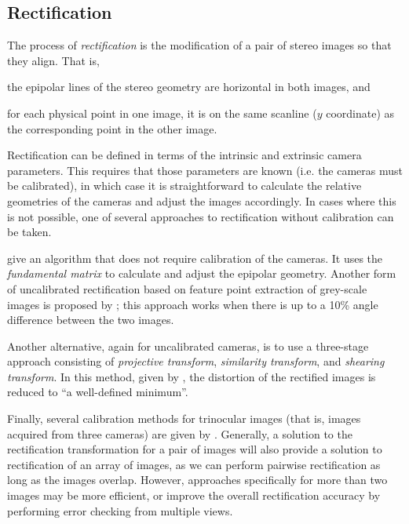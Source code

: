 \subsection{Rectification}
\label{sec:rectification-prior}

The process of \emph{rectification} is the modification of a pair of stereo images so that they align. That is, \begin{inparaenum}[(a)] \item the epipolar lines of the stereo geometry are horizontal in both images, and
\item for each physical point in one image, it is on the same scanline ($y$ coordinate) as the corresponding point in the other image. \end{inparaenum}

Rectification can be defined in terms of the intrinsic and extrinsic camera parameters. This requires that those parameters are known (i.e. the cameras must be calibrated), in which case it is straightforward to calculate the relative geometries of the cameras and adjust the images accordingly. In cases where this is not
possible, one of several approaches to rectification without calibration can be taken.

\citet{chen03} give an algorithm that does not require calibration of the cameras. It uses the \emph{fundamental matrix} to calculate and adjust the epipolar geometry. Another form of uncalibrated rectification based on feature point extraction of grey-scale images is proposed by
\citet{papadimitriou96:_epipol}; this approach works when there is up to a 10\% angle
difference between the two images.

Another alternative, again for uncalibrated cameras, is to use a three-stage approach consisting of \emph{projective transform}, \emph{similarity transform}, and \emph{shearing transform}. In this method, given by \citet{loop99:_comput}, the distortion of the rectified images is reduced to ``a well-defined minimum''.

Finally, several calibration methods for trinocular images (that is, images acquired from three cameras) are given by \citet{sun03:_uncal}. Generally, a solution to the rectification transformation for a pair of images will also provide a solution to rectification of an array of images, as we can perform pairwise rectification as long as the images overlap. However, approaches specifically for more than two images may be more efficient, or improve the overall rectification accuracy by performing error checking from multiple views.
